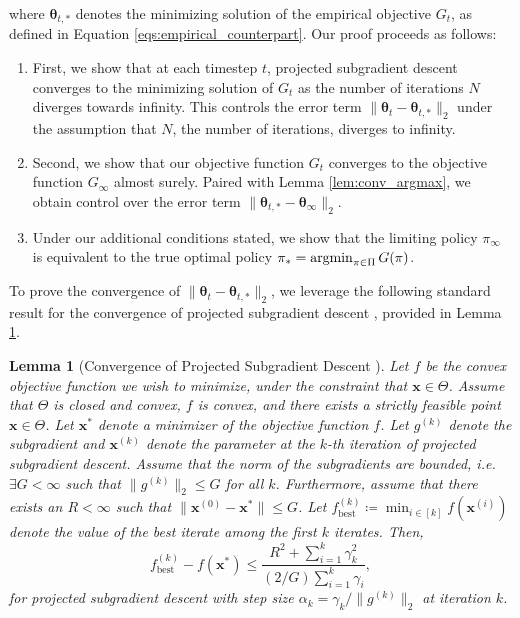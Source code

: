 \documentclass{article}
\newtheorem{lemma}{Lemma}
\begin{document}
\begin{appendices}
\begin{equation}
\end{equation}
where $\bm{\theta}_{t,*}$ denotes the minimizing solution of the empirical objective $G_{t}$, as defined in Equation \eqref{eqs:empirical_counterpart}. Our proof proceeds as follows:
\begin{enumerate}
    \item First, we show that at each timestep $t$, projected subgradient descent converges to the minimizing solution of $G_t$ as the number of iterations $N$ diverges towards infinity. This controls the error term $\|\bm{\theta}_t - \bm{\theta}_{t,*}\|_2$ under the assumption that $N$, the number of iterations, diverges to infinity. 
    \item Second, we show that our objective function $G_t$ converges to the objective function $G_\infty$ almost surely. Paired with Lemma \ref{lem:conv_argmax}, we obtain control over the error term $\|\bm{\theta}_{t,*} - \bm{\theta}_{\infty} \|_2$.
    \item Under our additional conditions stated, we show that the limiting policy $\pi_\infty$ is equivalent to the true optimal policy $\pi_* = \argmin_{\pi \in \Pi} G(\pi)$. 
\end{enumerate}

To prove the convergence of $\|\bm\theta_t - \bm{\theta}_{t,*} \|_2$, we leverage the following standard result for the convergence of projected subgradient descent \citep{boyd2014subgradient-ee364b}, provided in Lemma \ref{lem:convergence_subgrad_descent}. 

\begin{lemma}[Convergence of Projected Subgradient Descent \citep{boyd2014subgradient-ee364b}]\label{lem:convergence_subgrad_descent}
    Let $f$ be the convex objective function we wish to minimize, under the constraint that $\bm{x} \in \Theta$. Assume that $\Theta$ is closed and convex, $f$ is convex, and there exists a strictly feasible point $\bm{x} \in \Theta$. Let $\bm{x}^*$ denote a minimizer of the objective function $f$. Let $g^{(k)}$ denote the subgradient and $\bm{x}^{(k)}$ denote the parameter at the $k$-th iteration of projected subgradient descent. Assume that the norm of the subgradients are bounded, i.e. $\exists G < \infty$ such that $\|g^{(k)} \|_2 \leq G$ for all $k$. Furthermore, assume that there exists an $R< \infty$ such that $\|\bm{x}^{(0)} - \bm{x}^* \| \leq G$. Let $f_{\text{best}}^{(k)} \coloneqq \min_{i \in [k]}f(\bm{x}^{(i)})$ denote the value of the best iterate among the first $k$ iterates. Then,
    \begin{equation}
        f_{\text{best}}^{(k)} - f(\bm{x}^*) \leq \frac{R^2 + \sum_{i=1}^k \gamma_k^2}{(2/G)\sum_{i=1}^k \gamma_i},
    \end{equation}
    for projected subgradient descent with step size $\alpha_k = \gamma_k / \| g^{(k)} \|_2$ at iteration $k$.
\end{lemma}


\end{appendices}
\end{document}
